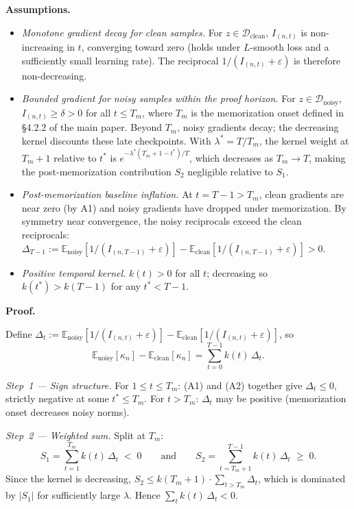 \textbf{Assumptions.}
\begin{itemize}
    \item[\textbf{(A1)}] \textit{Monotone gradient decay for clean samples.}
        For $z \in \mathcal{D}_\text{clean}$, $I_{(n,t)}$ is non-increasing in $t$, converging toward zero (holds under $L$-smooth loss and a sufficiently small learning rate). The reciprocal $1/(I_{(n,t)}+\varepsilon)$ is therefore non-decreasing.
    \item[\textbf{(A2)}] \textit{Bounded gradient for noisy samples within the proof horizon.}
        For $z \in \mathcal{D}_\text{noisy}$, $I_{(n,t)} \geq \delta > 0$ for all $t \leq T_m$, where $T_m$ is the memorization onset defined in \S4.2.2 of the main paper.
        Beyond $T_m$, noisy gradients decay; the decreasing kernel discounts these late checkpoints.
        With $\lambda^* = T/T_m$, the kernel weight at $T_m+1$ relative to $t^*$ is $e^{-\lambda^*(T_m+1-t^*)/T}$, which decreases as $T_m \to T$, making the post-memorization contribution $S_2$ negligible relative to $S_1$.
    \item[\textbf{(A3)}] \textit{Post-memorization baseline inflation.}
        At $t = T-1 > T_m$, clean gradients are near zero (by A1) and noisy gradients have dropped under memorization.
        By symmetry near convergence, the noisy reciprocals exceed the clean reciprocals:
        $\Delta_{T-1} := \mathbb{E}_\text{noisy}[1/(I_{(n,T-1)}+\varepsilon)] - \mathbb{E}_\text{clean}[1/(I_{(n,T-1)}+\varepsilon)] > 0$.
    \item[\textbf{(A4)}] \textit{Positive temporal kernel.}
        $k(t) > 0$ for all $t$; decreasing so $k(t^*) > k(T-1)$ for any $t^* < T-1$.
\end{itemize}

\textbf{Proof.}

Define $\Delta_t := \mathbb{E}_\text{noisy}[1/(I_{(n,t)}+\varepsilon)] - \mathbb{E}_\text{clean}[1/(I_{(n,t)}+\varepsilon)]$, so
\begin{equation}
    \mathbb{E}_\text{noisy}[\kappa_n] - \mathbb{E}_\text{clean}[\kappa_n]
    = \sum_{t=0}^{T-1} k(t)\,\Delta_t.
\end{equation}

\textit{Step~1 --- Sign structure.}
For $1 \leq t \leq T_m$: (A1) and (A2) together give $\Delta_t \leq 0$, strictly negative at some $t^* \leq T_m$.
For $t > T_m$: $\Delta_t$ may be positive (memorization onset decreases noisy norms).

\textit{Step~2 --- Weighted sum.}
Split at $T_m$:
\begin{equation}
    S_1 = \sum_{t=1}^{T_m} k(t)\,\Delta_t \;<\; 0
    \qquad \text{and} \qquad
    S_2 = \sum_{t=T_m+1}^{T-1} k(t)\,\Delta_t \;\geq\; 0.
\end{equation}
Since the kernel is decreasing, $S_2 \leq k(T_m+1) \cdot \sum_{t > T_m} \Delta_t$, which is dominated by $|S_1|$ for sufficiently large $\lambda$.
Hence $\sum_t k(t)\,\Delta_t < 0$.

